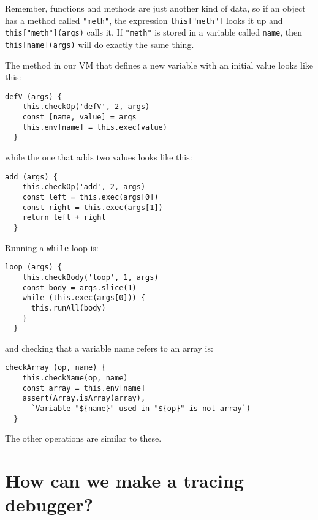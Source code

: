 \documentclass[krantzl]{krantz}
\begin{document}
\noindent Remember, functions and methods are just another kind of data,
so if an object has a method called \texttt{"meth"},
the expression \texttt{this["meth"]} looks it up
and \texttt{this["meth"](args)} calls it.
If \texttt{"meth"} is stored in a variable called \texttt{name},
then \texttt{this[name](args)} will do exactly the same thing.


The method in our VM that defines a new variable with an initial value looks like this:


\begin{lstlisting}[frame=single,frameround=tttt]
  defV (args) {
    this.checkOp('defV', 2, args)
    const [name, value] = args
    this.env[name] = this.exec(value)
  }
\end{lstlisting}



\noindent while the one that adds two values looks like this:


\begin{lstlisting}[frame=single,frameround=tttt]
  add (args) {
    this.checkOp('add', 2, args)
    const left = this.exec(args[0])
    const right = this.exec(args[1])
    return left + right
  }
\end{lstlisting}



Running a \texttt{while} loop is:


\begin{lstlisting}[frame=single,frameround=tttt]
  loop (args) {
    this.checkBody('loop', 1, args)
    const body = args.slice(1)
    while (this.exec(args[0])) {
      this.runAll(body)
    }
  }
\end{lstlisting}



\noindent and checking that a variable name refers to an array is:


\begin{lstlisting}[frame=single,frameround=tttt]
  checkArray (op, name) {
    this.checkName(op, name)
    const array = this.env[name]
    assert(Array.isArray(array),
      `Variable "${name}" used in "${op}" is not array`)
  }
\end{lstlisting}



The other operations are similar to these.

\section{How can we make a tracing debugger?}\label{debugger-tracing}
\end{document}
